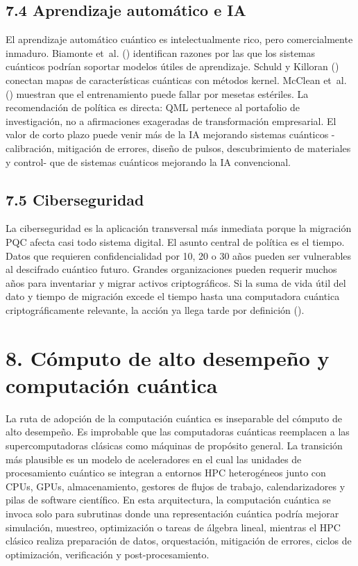 \documentclass[
  11pt,
  letterpaper,
]{article}
\begin{document}
\subsection{7.4 Aprendizaje automático e
IA}\label{aprendizaje-automuxe1tico-e-ia}

El aprendizaje automático cuántico es intelectualmente rico, pero
comercialmente inmaduro. Biamonte et~al.
() identifican razones por las que los
sistemas cuánticos podrían soportar modelos útiles de aprendizaje.
Schuld y Killoran () conectan mapas de
características cuánticas con métodos kernel. McClean et~al.
() muestran que el entrenamiento puede
fallar por mesetas estériles. La recomendación de política es directa:
QML pertenece al portafolio de investigación, no a afirmaciones
exageradas de transformación empresarial. El valor de corto plazo puede
venir más de la IA mejorando sistemas cuánticos -calibración, mitigación
de errores, diseño de pulsos, descubrimiento de materiales y control-
que de sistemas cuánticos mejorando la IA convencional.

\subsection{7.5 Ciberseguridad}\label{ciberseguridad}

La ciberseguridad es la aplicación transversal más inmediata porque la
migración PQC afecta casi todo sistema digital. El asunto central de
política es el tiempo. Datos que requieren confidencialidad por 10, 20 o
30 años pueden ser vulnerables al descifrado cuántico futuro. Grandes
organizaciones pueden requerir muchos años para inventariar y migrar
activos criptográficos. Si la suma de vida útil del dato y tiempo de
migración excede el tiempo hasta una computadora cuántica
criptográficamente relevante, la acción ya llega tarde por definición
().

\section{8. Cómputo de alto desempeño y computación
cuántica}\label{cuxf3mputo-de-alto-desempeuxf1o-y-computaciuxf3n-cuuxe1ntica}

La ruta de adopción de la computación cuántica es inseparable del
cómputo de alto desempeño. Es improbable que las computadoras cuánticas
reemplacen a las supercomputadoras clásicas como máquinas de propósito
general. La transición más plausible es un modelo de aceleradores en el
cual las unidades de procesamiento cuántico se integran a entornos HPC
heterogéneos junto con CPUs, GPUs, almacenamiento, gestores de flujos de
trabajo, calendarizadores y pilas de software científico. En esta
arquitectura, la computación cuántica se invoca solo para subrutinas
donde una representación cuántica podría mejorar simulación, muestreo,
optimización o tareas de álgebra lineal, mientras el HPC clásico realiza
preparación de datos, orquestación, mitigación de errores, ciclos de
optimización, verificación y post-procesamiento.
\end{document}
